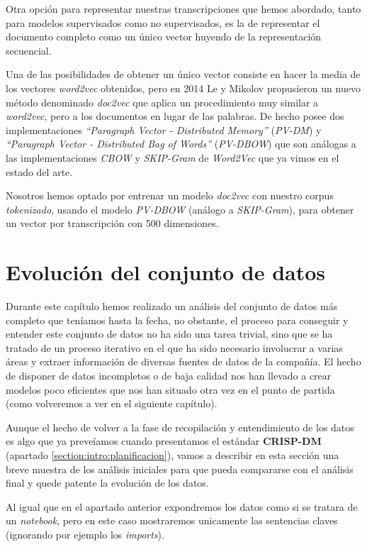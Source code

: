 Otra opción para representar nuestras transcripciones que hemos abordado, tanto para modelos supervisados como no supervisados, es la de representar el documento completo como un único vector huyendo de la representación secuencial.

Una de las posibilidades de obtener un único vector consiste en hacer la media de los vectores \textit{word2vec} obtenidos, pero en 2014 Le y Mikolov \cite{doc2vec} propusieron un nuevo método denominado \textit{doc2vec} que aplica un procedimiento muy similar a \textit{word2vec}, pero a los documentos en lugar de las palabras. De hecho posee dos implementaciones \textit{``Paragraph Vector - Distributed Memory''} (\textit{PV-DM}) y \textit{``Paragraph Vector - Distributed Bag of Words''} (\textit{PV-DBOW}) que son análogas a las implementaciones \textit{CBOW} y \textit{SKIP-Gram} de \textit{Word2Vec} que ya vimos en el estado del arte.


Nosotros hemos optado por entrenar un modelo \textit{doc2vec} con nuestro corpus \textit{tokenizado},  usando el modelo \textit{PV-DBOW} (análogo a \textit{SKIP-Gram}), para obtener un vector por transcripción con 500 dimensiones.


\section{Evolución del conjunto de datos}
\label{section:data:evol}

Durante este capítulo hemos realizado un análisis del conjunto de datos más completo que teníamos hasta la fecha, no obstante, el proceso para conseguir y entender este conjunto de datos no ha sido una tarea trivial, sino que se ha tratado de un proceso iterativo en el que ha sido necesario involucrar a varias áreas y extraer información de diversas fuentes de datos de la compañía. El hecho de disponer de datos incompletos o de baja calidad nos han llevado a crear modelos poco eficientes que nos han situado otra vez en el punto de partida (como volveremos a ver en el siguiente capítulo). 

Aunque el hecho de volver a la fase de recopilación y entendimiento de los datos es algo que ya preveíamos cuando presentamos el estándar \textbf{CRISP-DM} (apartado \ref{section:intro:planificacion}),  vamos a describir en esta sección una breve muestra de los análisis iniciales para que pueda compararse con el análisis final y quede patente la evolución de los datos.

Al igual que en el apartado anterior expondremos los datos como si se tratara de un \textit{notebook}, pero en este caso mostraremos unicamente las sentencias claves (ignorando por ejemplo los \textit{imports}). 

